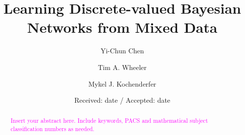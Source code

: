 \DeclareMathOperator*{\argmin}{arg\,min}
\DeclareMathOperator*{\argmax}{arg\,max}

\newcommand{\todo}[1]{\textcolor{magenta}{#1}}
\newcommand{\tim}[1]{\textit{\textcolor{blue}{#1}}}




\title{Learning Discrete-valued Bayesian Networks from Mixed Data%
}


\author{Yi-Chun Chen           \and
        Tim A. Wheeler         \and
        Mykel J. Kochenderfer
}



\date{Received: date / Accepted: date}


\maketitle

\begin{abstract}
\todo{
Insert your abstract here. Include keywords, PACS and mathematical
subject classification numbers as needed.
}
\end{abstract}


